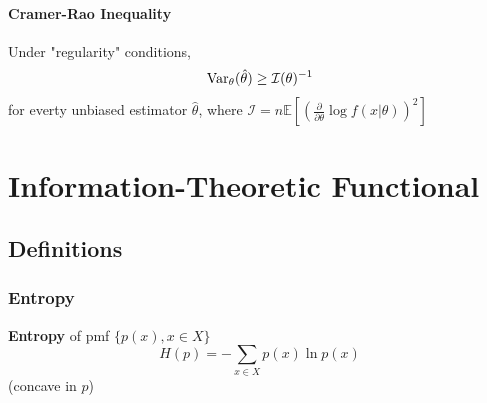 \documentclass[11pt]{elegantbook}
\begin{document}
\subsubsection*{Cramer-Rao Inequality}
\begin{proposition}
Under "regularity" conditions,
\begin{equation}
    \begin{aligned}
        \textnormal{Var}_\theta(\hat{\theta})\geq \mathcal{I}(\theta)^{-1}
    \end{aligned}
    \nonumber
\end{equation}
for everty unbiased estimator $\hat{\theta}$, where $\mathcal{I}=n \mathbb{E}[\left(\frac{\partial}{\partial \theta}\log f(x|\theta)\right)^2]$
\end{proposition}

























































\chapter{Information-Theoretic Functional}
\section{Definitions}
\subsection{Entropy}
\begin{definition}[Entropy]
    \textbf{Entropy} of pmf $\{p(x),x\in X\}$ $$H(p)=-\sum_{x\in X}p(x)\ln p(x)$$
    (concave in $p$)
\end{definition}
\end{document}
